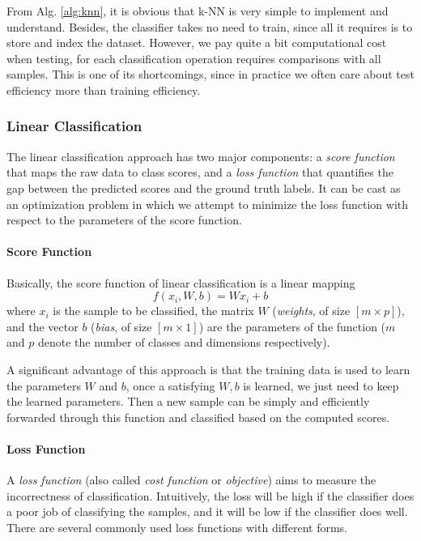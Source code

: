 \documentclass[10pt,twocolumn,letterpaper]{article}
\begin{document}
	From Alg. \ref{alg:knn}, it is obvious that k-NN is very simple to implement and understand. Besides, the classifier takes no need to train, since all it requires is to store and index the dataset. However, we pay quite a bit computational cost when testing, for each classification operation requires comparisons with all samples. This is one of its shortcomings, since in practice we often care about test efficiency more than training efficiency.
		
\subsubsection{Linear Classification}
	The linear classification approach has two major components: a \emph{score function} that maps the raw data to class scores, and a \emph{loss function} that quantifies the gap between the predicted scores and the ground truth labels. It can be cast as an optimization problem in which we attempt to minimize the loss function with respect to the parameters of the score function. \cite{svmCS231n}

\paragraph{Score Function}
	Basically, the score function of linear classification is a linear mapping
\begin{equation}
	f(x_i, W, b) = W x_i + b
\end{equation}
	where $x_i$ is the sample to be classified, the matrix $W$ (\emph{weights}, of size $[m \times p]$), and the vector $b$ (\emph{bias}, of size $[m \times 1]$) are the parameters of the function ($m$ and $p$ denote the number of classes and dimensions respectively).
	
	A significant advantage of this approach is that the training data is used to learn the parameters $W$ and $b$, once a satisfying $W, b$ is learned, we just need to keep the learned parameters. Then a new sample can be simply and efficiently forwarded through this function and classified based on the computed scores.

\paragraph{Loss Function}
	A \emph{loss function} (also called \textit{cost function} or \textit{objective}) aims to measure the incorrectness of classification. Intuitively, the loss will be high if the classifier does a poor job of classifying the samples, and it will be low if the classifier does well. There are several commonly used loss functions with different forms.
\end{document}
